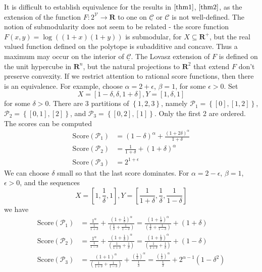 \documentclass{article}
\theoremstyle{case}
\begin{document}
It is difficult to establish equivalence for the results in $\ref{thm1}$, $\ref{thm2}$, as the extension of the function $F \colon 2^\mathcal{V} \rightarrow \mathbf{R}$ to one on $\underline{\mathcal{C}}$ or $\mathcal{C}$ is not well-defined. The notion of submodularity does not seem to be related - the score function $F(x,y) = \log((1+x)(1+y))$ is submodular, for $X \subseteq \mathbf{R}^+$, but the real valued function defined on the polytope is subadditive and concave. Thus a maximum may occur on the interior of $\underline{\mathcal{C}}$. The Lovasz extension of $F$ is defined on the unit hypercube in $\mathbf{R}^n$, but the natural projections to $\mathbf{R}^2$ that extend $F$ don't preserve convexity. If we restrict attention to rational score functions, then there is an equivalence. For example,  choose $\alpha = 2 + \epsilon$, $\beta = 1$, for some $\epsilon > 0$. Set
\[
X = \left[ 1-\delta, \delta, 1 + \delta\right], Y = \left[ 1, \delta, 1\right]
\] 
for some $\delta > 0$. There are 3 partitions of $\left\lbrace 1, 2, 3\right\rbrace$, namely $\mathcal{P}_1 = \left\lbrace \left[ 0 \right], \left[ 1, 2\right]\right\rbrace$, $\mathcal{P}_2 = \left\lbrace \left[ 0, 1 \right], \left[ 2\right]\right\rbrace$, and $\mathcal{P}_3 = \left\lbrace \left[ 0, 2 \right], \left[ 1 \right]\right\rbrace$. Only the first 2 are ordered. The scores can be computed
\begin{align*}
\text{Score}\left(\mathcal{P}_1\right) & = \left( 1-\delta \right)^\alpha + \frac{\left( 1+2\delta\right)^\alpha}{1+\delta} \\
\text{Score}\left(\mathcal{P}_2\right) & = \frac{1}{1+\delta} + \left( 1+\delta\right)^\alpha \\
\text{Score}\left(\mathcal{P}_3\right) & = 2^{1+\epsilon}
\end{align*}
We can choose $\delta$ small so that the last score dominates.
For $\alpha = 2 - \epsilon$, $\beta = 1$, $\epsilon > 0$, and the sequences
\[
X = \left[ 1, \frac{1}{\delta}, 1\right], Y = \left[ \frac{1}{1+\delta}, \frac{1}{\delta}, \frac{1}{1-\delta}\right]
\] 
we have
\begin{align*}
\text{Score}\left(\mathcal{P}_1\right) & = \frac{1^\alpha}{\frac{1}{1+\delta}} + \frac{\left(1 + \frac{1}{\delta}\right)^\alpha}{\left( \frac{1}{\delta} + \frac{1}{1 - \delta}\right) }  = \frac{\left(1 + \frac{1}{\delta}\right)^\alpha}{\left( \frac{1}{\delta} + \frac{1}{1 - \delta}\right) } + \left( 1 + \delta \right)\\
\text{Score}\left(\mathcal{P}_2\right) & = \frac{1^\alpha}{\frac{1}{1-\delta}} + \frac{\left( 1 + \frac{1}{\delta}\right)^\alpha}{\left( \frac{1}{1+\delta} + \frac{1}{\delta}\right)}  = \frac{\left( 1 + \frac{1}{\delta}\right)^\alpha}{\left( \frac{1}{1+\delta} + \frac{1}{\delta}\right)} + \left( 1 - \delta \right)\\
\text{Score}\left(\mathcal{P}_3\right) & = \frac{\left( 1 + 1\right)^\alpha}{\left(\frac{1}{1+\delta} + \frac{1}{1-\delta}\right)}  + \frac{\left( \frac{1}{\delta}\right)^\alpha}{\frac{1}{\delta}} = \frac{\left( \frac{1}{\delta}\right)^\alpha}{\frac{1}{\delta}} + 2^{\alpha - 1}\left( 1 - \delta^2\right) 
\end{align*}
\end{document}
